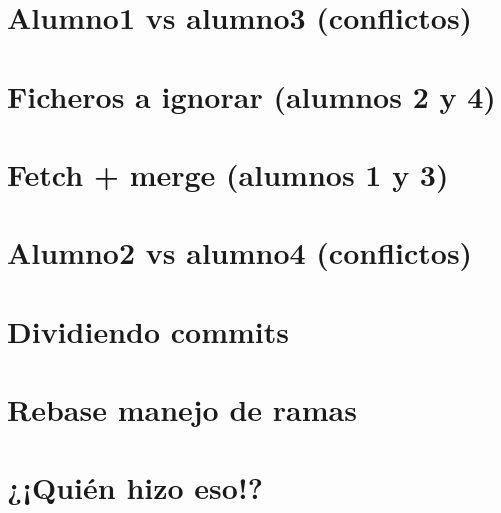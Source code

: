 \documentclass{article}
\begin{document}
\section{Alumno1 vs alumno3 (conflictos)}
\section{Ficheros a ignorar (alumnos 2 y 4)}
\section{Fetch + merge (alumnos 1 y 3)}
\section{Alumno2 vs alumno4 (conflictos)}
\section{Dividiendo commits}
\section{Rebase manejo de ramas}
\section{¿¡Quién hizo eso!?}
\end{document}
